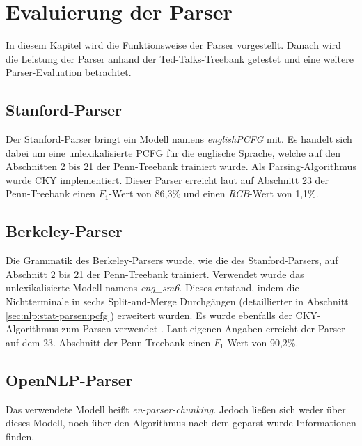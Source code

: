 %
\chapter{Evaluierung der Parser}
\label{sec:eval}

In diesem Kapitel wird die Funktionsweise der Parser vorgestellt. Danach wird die Leistung der Parser anhand der Ted-Talks-Treebank getestet und eine weitere Parser-Evaluation betrachtet.


\section{Stanford-Parser}
Der Stanford-Parser bringt ein Modell namens \textit{englishPCFG} mit. Es handelt sich dabei um eine unlexikalisierte PCFG für die englische Sprache, welche auf den Abschnitten 2 bis 21 der Penn-Treebank trainiert wurde. Als Parsing-Algorithmus wurde CKY implementiert. Dieser Parser erreicht laut \cite{stanfordparser} auf Abschnitt 23 der Penn-Treebank einen \(F_1\)-Wert von 86,3\% und einen \textit{RCB}-Wert von 1,1\%. \cite{stanfordparser}

\section{Berkeley-Parser}
Die Grammatik des Berkeley-Parsers wurde, wie die des Stanford-Parsers, auf Abschnitt 2 bis 21 der Penn-Treebank trainiert. Verwendet wurde das unlexikalisierte Modell namens \textit{eng\_sm6}. Dieses entstand, indem die Nichtterminale in sechs Split-and-Merge Durchgängen (detaillierter in Abschnitt \ref{sec:nlp:stat-parsen:pcfg}) erweitert wurden. Es wurde ebenfalls der CKY-Algorithmus zum Parsen verwendet \cite{berkeleycky}. Laut eigenen Angaben erreicht der Parser auf dem 23. Abschnitt der Penn-Treebank einen \(F_1\)-Wert von 90,2\%. \cite{berkeleyparser1}

\section{OpenNLP-Parser}

Das verwendete Modell heißt \textit{en-parser-chunking}. Jedoch ließen sich weder über dieses Modell, noch über den Algorithmus nach dem geparst wurde Informationen finden.


